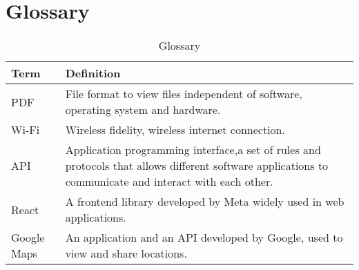 \chapter{Glossary}

\begin{table}[H]
    \begin{tabular}{|p{3cm}|p{13cm}|}
        \hline
        \textbf{Term} & \textbf{Definition} \\
        \hline
        \hline
        PDF & File format to view files independent of software, operating system and hardware.\\
        \hline
        Wi-Fi & Wireless fidelity, wireless internet connection.\\
        \hline
        API & Application programming interface,a set of rules and protocols that allows different software applications to communicate and interact with each other. \\
        \hline
        React & A frontend library developed by Meta widely used in web applications. \\
        \hline
        Google Maps & An application and an API developed by Google, used to view and share locations.\\
        \hline
        
        \end{tabular}
    \caption[Glossary]{Glossary}
\end{table}